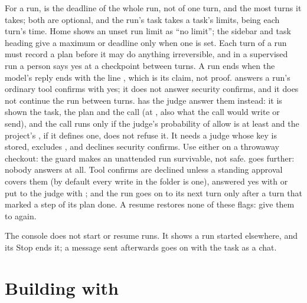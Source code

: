 For a run,  is the deadline of the whole run, not of
one turn, and  the most turns it takes; both are
optional, and the run's task takes a task's limits, 
being each turn's time. Home shows an unset run limit as ``no limit'';
the sidebar and task heading give a maximum or deadline only when one is set.
Each turn of a run must record a plan before it may do anything
irreversible, and in a supervised run a person says yes at a checkpoint
between turns. A run
ends when the model's reply ends with the line ,
which is its claim, not proof.  answers a run's ordinary tool
confirms with yes; it does not answer security confirms, and it does not
continue the run between turns.  has the judge answer them
instead: it is shown the task, the plan and the call (at
, also what the call would write or send), and
the call runs only if the judge's probability of allow is at least
 and the project's , if
it defines one, does not refuse it. It needs a judge whose key is stored,
excludes , and declines security confirms. Use either on a
throwaway checkout: the guard makes an unattended run survivable, not safe.
 goes further: nobody answers at all. Tool confirms
are declined unless a standing approval covers them (by default every
write in the folder is one), answered yes with
 or put to the judge with ; and the run goes on to its next turn
only after a turn that marked a step of its plan done. A resume restores
none of these flags: give them to  again.

The console does not start or resume runs. It shows a run started
elsewhere, and its Stop ends it; a message sent afterwards goes on with the
task as a chat.

\chapter{Building \nodwyn{} with \nodwyn}

